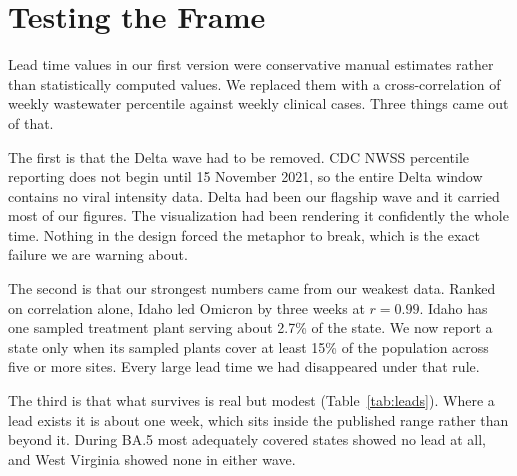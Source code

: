 
\section{Testing the Frame}

Lead time values in our first version were conservative manual estimates rather
than statistically computed values. We replaced them with a cross-correlation of
weekly wastewater percentile against weekly clinical cases. Three things came out
of that.

The first is that the Delta wave had to be removed. CDC NWSS percentile reporting
does not begin until 15 November 2021, so the entire Delta window contains no
viral intensity data. Delta had been our flagship wave and it carried most of our
figures. The visualization had been rendering it confidently the whole time.
Nothing in the design forced the metaphor to break, which is the exact failure we
are warning about.

The second is that our strongest numbers came from our weakest data. Ranked on
correlation alone, Idaho led Omicron by three weeks at $r = 0.99$. Idaho has one
sampled treatment plant serving about 2.7\% of the state. We now report a state
only when its sampled plants cover at least 15\% of the population across five or
more sites. Every large lead time we had disappeared under that rule.

The third is that what survives is real but modest (Table~\ref{tab:leads}). Where
a lead exists it is about one week, which sits inside the published range rather
than beyond it. During BA.5 most adequately covered states showed no lead at all,
and West Virginia showed none in either wave.

